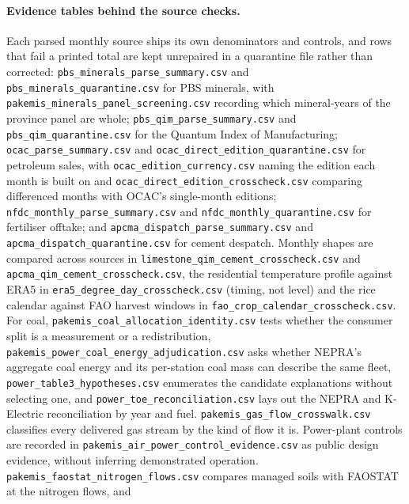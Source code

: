 \documentclass[essd]{copernicus}
\begin{document}
\paragraph{Evidence tables behind the source checks.} Each parsed monthly source ships its own denominators and controls, and rows that fail a printed total are kept unrepaired in a quarantine file rather than corrected: \texttt{pbs\_\allowbreak minerals\_\allowbreak parse\_\allowbreak summary.csv} and \texttt{pbs\_\allowbreak minerals\_\allowbreak quarantine.csv} for PBS minerals, with \texttt{pakemis\_\allowbreak minerals\_\allowbreak panel\_\allowbreak screening.csv} recording which mineral-years of the province panel are whole; \texttt{pbs\_\allowbreak qim\_\allowbreak parse\_\allowbreak summary.csv} and \texttt{pbs\_\allowbreak qim\_\allowbreak quarantine.csv} for the Quantum Index of Manufacturing; \texttt{ocac\_\allowbreak parse\_\allowbreak summary.csv} and \texttt{ocac\_\allowbreak direct\_\allowbreak edition\_\allowbreak quarantine.csv} for petroleum sales, with \texttt{ocac\_\allowbreak edition\_\allowbreak currency.csv} naming the edition each month is built on and \texttt{ocac\_\allowbreak direct\_\allowbreak edition\_\allowbreak crosscheck.csv} comparing differenced months with OCAC's single-month editions; \texttt{nfdc\_\allowbreak monthly\_\allowbreak parse\_\allowbreak summary.csv} and \texttt{nfdc\_\allowbreak monthly\_\allowbreak quarantine.csv} for fertiliser offtake; and \texttt{apcma\_\allowbreak dispatch\_\allowbreak parse\_\allowbreak summary.csv} and \texttt{apcma\_\allowbreak dispatch\_\allowbreak quarantine.csv} for cement despatch. Monthly shapes are compared across sources in \texttt{limestone\_\allowbreak qim\_\allowbreak cement\_\allowbreak crosscheck.csv} and \texttt{apcma\_\allowbreak qim\_\allowbreak cement\_\allowbreak crosscheck.csv}, the residential temperature profile against ERA5 in \texttt{era5\_\allowbreak degree\_\allowbreak day\_\allowbreak crosscheck.csv} (timing, not level) and the rice calendar against FAO harvest windows in \texttt{fao\_\allowbreak crop\_\allowbreak calendar\_\allowbreak crosscheck.csv}. For coal, \texttt{pakemis\_\allowbreak coal\_\allowbreak allocation\_\allowbreak identity.csv} tests whether the consumer split is a measurement or a redistribution, \texttt{pakemis\_\allowbreak power\_\allowbreak coal\_\allowbreak energy\_\allowbreak adjudication.csv} asks whether NEPRA's aggregate coal energy and its per-station coal mass can describe the same fleet, \texttt{power\_\allowbreak table3\_\allowbreak hypotheses.csv} enumerates the candidate explanations without selecting one, and \texttt{power\_\allowbreak toe\_\allowbreak reconciliation.csv} lays out the NEPRA and K-Electric reconciliation by year and fuel. \texttt{pakemis\_\allowbreak gas\_\allowbreak flow\_\allowbreak crosswalk.csv} classifies every delivered gas stream by the kind of flow it is. Power-plant controls are recorded in \texttt{pakemis\_\allowbreak air\_\allowbreak power\_\allowbreak control\_\allowbreak evidence.csv} as public design evidence, without inferring demonstrated operation. \texttt{pakemis\_\allowbreak faostat\_\allowbreak nitrogen\_\allowbreak flows.csv} compares managed soils with FAOSTAT at the nitrogen flows, and 
\end{document}
